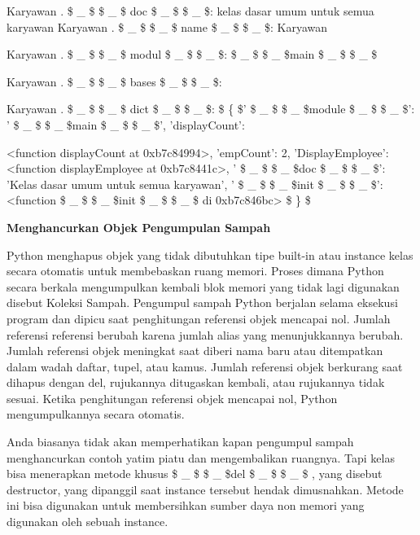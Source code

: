 \begin{12pt}
\begin{12pt}
\begin{12pt}
\begin{12pt}
\begin{12pt}
\begin{12pt}
\begin{12pt}
\begin{12pt}
\begin{12pt}
\begin{12pt}
\begin{12pt}
\begin{12pt}
\begin{12pt}
\begin{12pt}
\begin{12pt}
\begin{12pt}
\vspace{12pt}
\noindent 
Karyawan . \$  \_  \$ \$  \_  \$ doc \$  \_  \$ \$  \_  \$: kelas dasar umum untuk semua karyawan 
\noindent 
Karyawan . \$  \_  \$ \$  \_  \$ name \$  \_  \$ \$  \_  \$: Karyawan \par
\noindent 
Karyawan . \$  \_  \$ \$  \_  \$ modul \$  \_  \$ \$  \_  \$:  \$  \_  \$ \$  \_  \$main \$  \_  \$ \$  \_  \$ \par
\noindent 
Karyawan . \$  \_  \$ \$  \_  \$ bases \$  \_  \$ \$  \_  \$: {}\par
\noindent 
Karyawan . \$  \_  \$ \$  \_  \$ dict \$  \_  \$ \$  \_  \$:  \$  \{  \$' \$  \_  \$ \$  \_  \$module \$  \_  \$ \$  \_  \$': ' \$  \_  \$ \$  \_  \$main \$  \_  \$ \$  \_  \$', 'displayCount': \par
\noindent 
<function displayCount at 0xb7c84994>, 'empCount': 2, 
\noindent 
'DisplayEmployee': <function displayEmployee at 0xb7c8441c>, 
\noindent 
' \$  \_  \$ \$  \_  \$doc \$  \_  \$ \$  \_  \$': 'Kelas dasar umum untuk semua karyawan', 
\noindent 
' \$  \_  \$ \$  \_  \$init \$  \_  \$ \$  \_  \$': <function  \$  \_  \$ \$  \_  \$init \$  \_  \$ \$  \_  \$ di 0xb7c846bc> \$  \}  \$ 
\vspace{12pt}
\noindent 
{\fontsize{14pt}{14pt}\selectfont \textbf{Menghancurkan Objek {Pengumpulan Sampah} \\} \par
\vspace{12pt}
Python menghapus objek yang tidak dibutuhkan {tipe built-in atau instance kelas} secara otomatis untuk membebaskan ruang memori. Proses dimana Python secara berkala mengumpulkan kembali blok memori yang tidak lagi digunakan disebut Koleksi Sampah. Pengumpul sampah Python berjalan selama eksekusi program dan dipicu saat penghitungan referensi objek mencapai nol. Jumlah referensi referensi berubah karena jumlah alias yang menunjukkannya berubah. Jumlah referensi objek meningkat saat diberi nama baru atau ditempatkan dalam wadah {daftar, tupel, atau kamus}. Jumlah referensi objek berkurang saat dihapus dengan del, rujukannya ditugaskan kembali, atau rujukannya tidak sesuai. Ketika penghitungan referensi objek mencapai nol, Python mengumpulkannya secara otomatis. \par
\begin{12pt}
Anda biasanya tidak akan memperhatikan kapan pengumpul sampah menghancurkan contoh yatim piatu dan mengembalikan ruangnya. Tapi kelas bisa menerapkan metode khusus  \$  \_  \$ \$  \_  \$del  \$  \_  \$ \$  \_  \$ {}, yang disebut destructor, yang dipanggil saat instance tersebut hendak dimusnahkan. Metode ini bisa digunakan untuk membersihkan sumber daya non memori yang digunakan oleh sebuah instance. \par

\end{12pt}}
\end{12pt}
\end{12pt}
\end{12pt}
\end{12pt}
\end{12pt}
\end{12pt}
\end{12pt}
\end{12pt}
\end{12pt}
\end{12pt}
\end{12pt}
\end{12pt}
\end{12pt}
\end{12pt}
\end{12pt}
\end{12pt}
